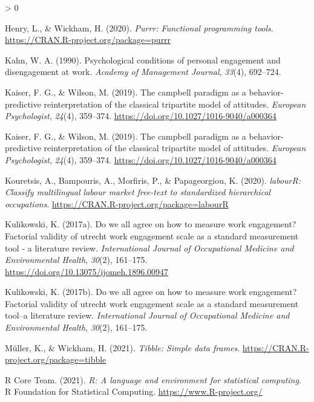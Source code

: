 \documentclass[
  english,
  man]{apa7}
\newlength{\cslhangindent}
\newenvironment{CSLReferences}[2] %
 {%
  \setlength{\parindent}{0pt}
  \ifodd #1 \everypar{\setlength{\hangindent}{\cslhangindent}}\ignorespaces\fi
  \ifnum #2 > 0
  \setlength{\parskip}{#2\baselineskip}
  \fi
 }%
 {}
\begin{document}
\begin{CSLReferences}{1}{0}
\leavevmode\hypertarget{ref-R-purrr}{}%
Henry, L., \& Wickham, H. (2020). \emph{Purrr: Functional programming tools}. \url{https://CRAN.R-project.org/package=purrr}

\leavevmode\hypertarget{ref-kahn1990psychological}{}%
Kahn, W. A. (1990). Psychological conditions of personal engagement and disengagement at work. \emph{Academy of Management Journal}, \emph{33}(4), 692--724.

\leavevmode\hypertarget{ref-kaiser_campbell_2019}{}%
Kaiser, F. G., \& Wilson, M. (2019). The campbell paradigm as a behavior-predictive reinterpretation of the classical tripartite model of attitudes. \emph{European Psychologist}, \emph{24}(4), 359--374. \url{https://doi.org/10.1027/1016-9040/a000364}

\leavevmode\hypertarget{ref-kaiser_campbell_2019}{}%
Kaiser, F. G., \& Wilson, M. (2019). The campbell paradigm as a behavior-predictive reinterpretation of the classical tripartite model of attitudes. \emph{European Psychologist}, \emph{24}(4), 359--374. \url{https://doi.org/10.1027/1016-9040/a000364}

\leavevmode\hypertarget{ref-R-labourR}{}%
Kouretsis, A., Bampouris, A., Morfiris, P., \& Papageorgiou, K. (2020). \emph{labourR: Classify multilingual labour market free-text to standardized hierarchical occupations}. \url{https://CRAN.R-project.org/package=labourR}

\leavevmode\hypertarget{ref-kulikowski_we_2017}{}%
Kulikowski, K. (2017a). Do we all agree on how to measure work engagement? Factorial validity of utrecht work engagement scale as a standard measurement tool - a literature review. \emph{International Journal of Occupational Medicine and Environmental Health}, \emph{30}(2), 161--175. \url{https://doi.org/10.13075/ijomeh.1896.00947}

\leavevmode\hypertarget{ref-kulikowski2017we}{}%
Kulikowski, K. (2017b). Do we all agree on how to measure work engagement? Factorial validity of utrecht work engagement scale as a standard measurement tool--a literature review. \emph{International Journal of Occupational Medicine and Environmental Health}, \emph{30}(2), 161--175.

\leavevmode\hypertarget{ref-R-tibble}{}%
Müller, K., \& Wickham, H. (2021). \emph{Tibble: Simple data frames}. \url{https://CRAN.R-project.org/package=tibble}

\leavevmode\hypertarget{ref-R-base}{}%
R Core Team. (2021). \emph{R: A language and environment for statistical computing}. R Foundation for Statistical Computing. \url{https://www.R-project.org/}


\end{CSLReferences}
\end{document}
